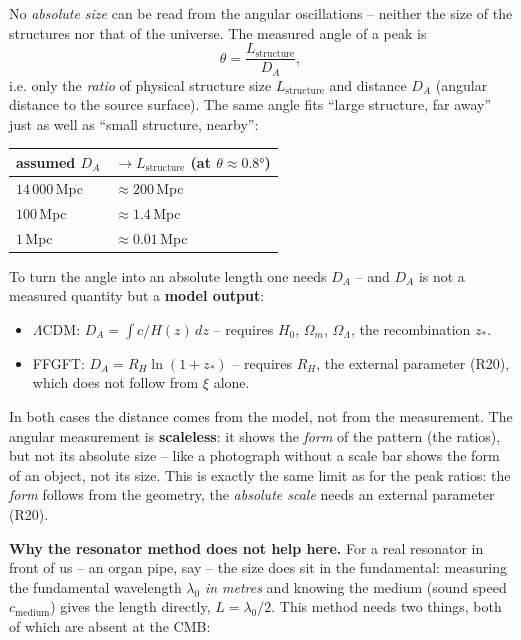 No \emph{absolute size} can be read from the angular oscillations --
neither the size of the structures nor that of the universe. The
measured angle of a peak is
\[
  \theta = \frac{L_\mathrm{structure}}{D_A},
\]
i.e. only the \emph{ratio} of physical structure size
$L_\mathrm{structure}$ and distance $D_A$ (angular distance to the
source surface). The same angle fits ``large structure, far away''
just as well as ``small structure, nearby'':

\begin{center}
\begin{tabular}{p{4cm}p{4cm}}
\toprule
\textbf{assumed $D_A$} & \textbf{$\to L_\mathrm{structure}$ (at $\theta\approx0{.}8°$)} \\
\midrule
$14\,000$\,Mpc & $\approx 200$\,Mpc \\
$100$\,Mpc & $\approx 1{.}4$\,Mpc \\
$1$\,Mpc & $\approx 0{.}01$\,Mpc \\
\bottomrule
\end{tabular}
\end{center}

To turn the angle into an absolute length one needs $D_A$ -- and
$D_A$ is not a measured quantity but a \textbf{model output}:
\begin{itemize}
  \item $\Lambda$CDM: $D_A = \int c/H(z)\,dz$ -- requires $H_0$,
        $\Omega_m$, $\Omega_\Lambda$, the recombination $z_*$.
  \item FFGFT: $D_A = R_H\ln(1+z_*)$ -- requires $R_H$, the external
        parameter (R20), which does not follow from $\xi$ alone.
\end{itemize}

In both cases the distance comes from the model, not from the
measurement. The angular measurement is \textbf{scaleless}: it shows
the \emph{form} of the pattern (the ratios), but not its absolute
size -- like a photograph without a scale bar shows the form of an
object, not its size. This is exactly the same limit as for the peak
ratios: the \emph{form} follows from the geometry, the \emph{absolute
scale} needs an external parameter (R20).

\textbf{Why the resonator method does not help here.} For a real
resonator in front of us -- an organ pipe, say -- the size does sit in
the fundamental: measuring the fundamental wavelength $\lambda_0$
\emph{in metres} and knowing the medium (sound speed
$c_\mathrm{medium}$) gives the length directly, $L = \lambda_0/2$. This
method needs two things, both of which are absent at the CMB:

